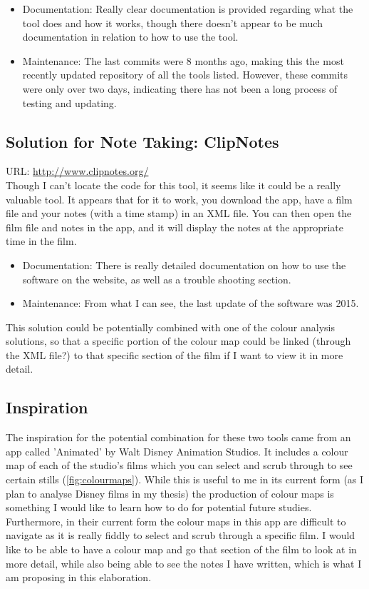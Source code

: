 \documentclass{article}
\begin{document}
\begin{itemize}
    \item Documentation: Really clear documentation is provided regarding what the tool does and how it works, though there doesn't appear to be much documentation in relation to how to use the tool.
    \item Maintenance: The last commits were 8 months ago, making this the most recently updated repository of all the tools listed. However, these commits were only over two days, indicating there has not been a long process of testing and updating.
\end{itemize}
 
\subsection{Solution for Note Taking: ClipNotes}
URL: \url{http://www.clipnotes.org/}\\

Though I can't locate the code for this tool, it seems like it could be a really valuable tool. It appears that for it to work, you download the app, have a film file and your notes (with a time stamp) in an XML file. You can then open the film file and notes in the app, and it will display the notes at the appropriate time in the film.
\begin{itemize}
    \item Documentation: There is really detailed documentation on how to use the software on the website, as well as a trouble shooting section.
    \item Maintenance: From what I can see, the last update of the software was 2015.
\end{itemize}

This solution could be potentially combined with one of the colour analysis solutions, so that a specific portion of the colour map could be linked (through the XML file?) to that specific section of the film if I want to view it in more detail.

\subsection{Inspiration}

The inspiration for the potential combination for these two tools came from an app called 'Animated' by Walt Disney Animation Studios. It includes a colour map of each of the studio's films which you can select and scrub through to see certain stills (\autoref{fig:colourmaps}). While this is useful to me in its current form (as I plan to analyse Disney films in my thesis) the production of colour maps is something I would like to learn how to do for potential future studies. Furthermore, in their current form the colour maps in this app are difficult to navigate as it is really fiddly to select and scrub through a specific film. I would like to be able to have a colour map and go that section of the film to look at in more detail, while also being able to see the notes I have written, which is what I am proposing in this elaboration.
\end{document}
